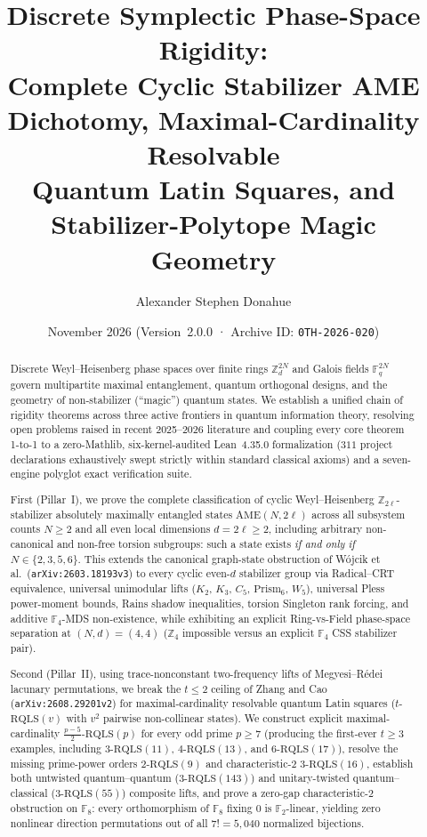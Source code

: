 \documentclass[11pt,reqno]{amsart}
\title[Discrete Symplectic Phase-Space Rigidity]{%
  Discrete Symplectic Phase-Space Rigidity:\\
  Complete Cyclic Stabilizer AME Dichotomy, Maximal-Cardinality Resolvable\\
  Quantum Latin Squares, and Stabilizer-Polytope Magic Geometry}
\author{Alexander Stephen Donahue}
\date{November 2026 \quad (Version~2.0.0 · Archive ID: \texttt{0TH-2026-020})}
\theoremstyle{definition}
\newcommand{\ZZ}{\mathbb{Z}}
\newcommand{\FF}{\mathbb{F}}
\newcommand{\AME}{\mathrm{AME}}
\newcommand{\RQLS}{\mathrm{RQLS}}
\newcommand{\lid}[1]{{\footnotesize\nolinkurl{#1}}}
\begin{document}
\begin{abstract}
Discrete Weyl--Heisenberg phase spaces over finite rings $\ZZ_d^{2N}$ and Galois fields
$\FF_q^{2N}$ govern multipartite maximal entanglement, quantum orthogonal designs, and
the geometry of non-stabilizer (``magic'') quantum states. We establish a unified chain
of rigidity theorems across three active frontiers in quantum information theory,
resolving open problems raised in recent 2025--2026 literature and coupling every core
theorem 1-to-1 to a zero-Mathlib, six-kernel-audited Lean~4.35.0 formalization
($311$ project declarations exhaustively swept strictly within standard classical axioms)
and a seven-engine polyglot exact verification suite.

First (Pillar~I), we prove the complete classification of cyclic Weyl--Heisenberg
$\ZZ_{2\ell}$-stabilizer absolutely maximally entangled states $\AME(N, 2\ell)$ across
all subsystem counts $N \ge 2$ and all even local dimensions $d = 2\ell \ge 2$,
including arbitrary non-canonical and non-free torsion subgroups: such a state exists
\emph{if and only if} $N \in \{2, 3, 5, 6\}$. This extends the canonical graph-state
obstruction of W\'ojcik et al.\ (\lid{arXiv:2603.18193v3}) to every cyclic even-$d$
stabilizer group via Radical--CRT equivalence, universal unimodular lifts ($K_2$, $K_3$,
$C_5$, $\mathrm{Prism}_6$, $W_5$), universal Pless power-moment bounds, Rains shadow
inequalities, torsion Singleton rank forcing, and additive $\FF_4$-MDS non-existence,
while exhibiting an explicit Ring-vs-Field phase-space separation at $(N, d) = (4, 4)$
($\ZZ_4$ impossible versus an explicit $\FF_4$ CSS stabilizer pair).

Second (Pillar~II), using trace-nonconstant two-frequency lifts of Megyesi--R\'edei
lacunary permutations, we break the $t \le 2$ ceiling of Zhang and Cao
(\lid{arXiv:2608.29201v2}) for maximal-cardinality resolvable quantum Latin squares
($t$-$\RQLS(v)$ with $v^2$ pairwise non-collinear states). We construct explicit
maximal-cardinality $\frac{p-5}{2}$-$\RQLS(p)$ for every odd prime $p \ge 7$ (producing
the first-ever $t \ge 3$ examples, including $3$-$\RQLS(11)$, $4$-$\RQLS(13)$, and
$6$-$\RQLS(17)$), resolve the missing prime-power orders $2$-$\RQLS(9)$ and
characteristic-$2$ $3$-$\RQLS(16)$, establish both untwisted quantum--quantum
($3$-$\RQLS(143)$) and unitary-twisted quantum--classical ($3$-$\RQLS(55)$) composite
lifts, and prove a zero-gap characteristic-$2$ obstruction on $\FF_8$: every
orthomorphism of $\FF_8$ fixing $0$ is $\FF_2$-linear, yielding zero nonlinear direction
permutations out of all $7! = 5{,}040$ normalized bijections.


\end{abstract}
\end{document}
